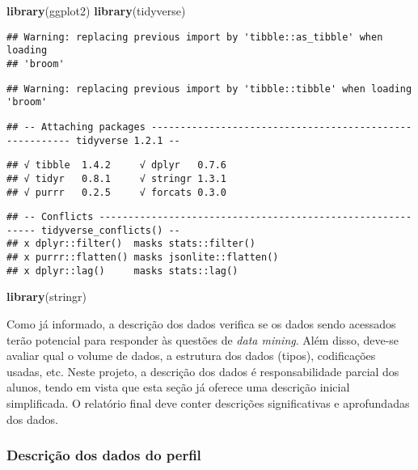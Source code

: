 \documentclass[]{article}
\newenvironment{Shaded}{\begin{snugshade}}{\end{snugshade}}
\newcommand{\KeywordTok}[1]{\textcolor[rgb]{0.13,0.29,0.53}{\textbf{#1}}}
\newcommand{\NormalTok}[1]{#1}
\begin{document}
\begin{Shaded}
\begin{Highlighting}[]
\KeywordTok{library}\NormalTok{(ggplot2)}
\KeywordTok{library}\NormalTok{(tidyverse)}
\end{Highlighting}
\end{Shaded}

\begin{verbatim}
## Warning: replacing previous import by 'tibble::as_tibble' when loading
## 'broom'
\end{verbatim}

\begin{verbatim}
## Warning: replacing previous import by 'tibble::tibble' when loading 'broom'
\end{verbatim}

\begin{verbatim}
## -- Attaching packages -------------------------------------------------------- tidyverse 1.2.1 --
\end{verbatim}

\begin{verbatim}
## √ tibble  1.4.2     √ dplyr   0.7.6
## √ tidyr   0.8.1     √ stringr 1.3.1
## √ purrr   0.2.5     √ forcats 0.3.0
\end{verbatim}

\begin{verbatim}
## -- Conflicts ----------------------------------------------------------- tidyverse_conflicts() --
## x dplyr::filter()  masks stats::filter()
## x purrr::flatten() masks jsonlite::flatten()
## x dplyr::lag()     masks stats::lag()
\end{verbatim}

\begin{Shaded}
\begin{Highlighting}[]
\KeywordTok{library}\NormalTok{(stringr)}
\end{Highlighting}
\end{Shaded}

Como já informado, a descrição dos dados verifica se os dados sendo
acessados terão potencial para responder às questões de \emph{data
mining}. Além disso, deve-se avaliar qual o volume de dados, a estrutura
dos dados (tipos), codificações usadas, etc. Neste projeto, a descrição
dos dados é responsabilidade parcial dos alunos, tendo em vista que esta
seção já oferece uma descrição inicial simplificada. O relatório final
deve conter descrições significativas e aprofundadas dos dados.

\subsubsection{Descrição dos dados do
perfil}\label{descricao-dos-dados-do-perfil}
\end{document}
